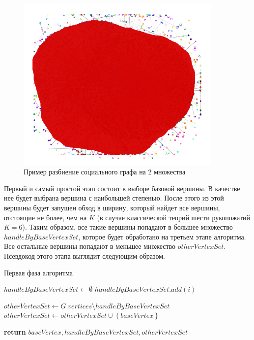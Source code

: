 \begin{figure}[h]
\centering
\includegraphics[width=0.9\textwidth]{img/floyd_social.png}
\caption{Пример разбиение социального графа на 2 множества}
\label {floyd_social}
\end{figure}

Первый и самый простой этап состоит в выборе базовой вершины. В качестве нее будет выбрана вершина с наибольшей степенью. После этого из этой вершины будет запущен обход в ширину, который найдет все вершины, отстоящие не более, чем на $K$ (в случае классической теорий шести рукопожатий $K = 6$). Таким образом, все такие вершины попадают в большее множество $handleByBaseVertexSet$, которое будет обработано на третьем этапе алгоритма. Все остальные вершины попадают в меньшее множество $otherVertexSet$. Псевдокод этого этапа выглядит следующим образом.

\FloatBarrier
\begin{algorithm}
\caption{Первая фаза алгоритма}\label{all_pairs_social1}
\begin{algorithmic}[1]
\State $handleByBaseVertexSet \gets \emptyset$
\algrenewcommand{} 
\algrenewcommand{}
		\State $handleByBaseVertexSet.add(i)$
	\EndIf
\EndFor

\State $otherVertexSet \gets G.vertices \setminus handleByBaseVertexSet$
\State $otherVertexSet \gets otherVertexSet \cup  \left\{ {baseVertex}\right\}$
 
\State \textbf{return} $ baseVertex, handleByBaseVertexSet, otherVertexSet$
\EndProcedure

\end{algorithmic}
\end{algorithm}




